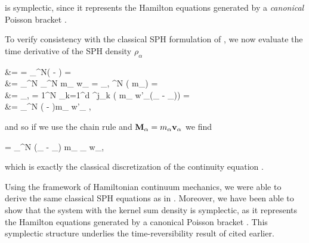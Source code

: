 \documentclass[../main.tex]{subfiles}
\begin{document}
is symplectic, since it represents the Hamilton equations generated by a \emph{canonical} Poisson bracket .

To verify consistency with the classical SPH formulation of , we now evaluate the time derivative of the SPH density $\rho_{\alpha}$ 
\begin{equations}[columns,*]
	 &= \pbr[SPH]{\rho_{\alpha}}{\totenSPH} = \sum_{}^N\left(  -  \right) = \\ 
			      &= \sum_{}^N   \sum_{}^N m_{\gamma} w_{\alpha \gamma} = \sum_{\beta, }^N \left( m_{\gamma}\right) = \\ 
			      &= \sum_{\beta, \gamma = 1}^N \sum_{k=1}^d \delta^j_k \left( m_{\gamma} w'_{\alpha \gamma}\left(\delta_{\alpha \beta} - \delta_{\gamma \beta}\right)\right) = \\ 
			      &= \sum_{}^N \left( - \right)m_{\gamma} w'_{\alpha \gamma} ,
\end{equations}

and so if we use the chain rule and $\mathbf{M}_{\alpha} = m_{\alpha} \mathbf{v}_{\alpha}$ we find

\begin{equations}[single,*]
	 = \sum_{}^N \left(_{\alpha} - _{\beta}\right) m_{\beta} \grad_{\alpha} w_{\alpha \beta},
\end{equations}

which is exactly the classical discretization of the continuity equation .

Using the framework of Hamiltonian continuum mechanics, we were able to derive the same classical SPH equations as in . Moreover, we have been able to show that the system  with the kernel sum density  is symplectic, as it represents the Hamilton equations generated by a canonical Poisson bracket . This symplectic structure underlies the time-reversibility result of \autocite{kinclGloballyTimereversibleFluid2023a} cited earlier.
\end{document}
